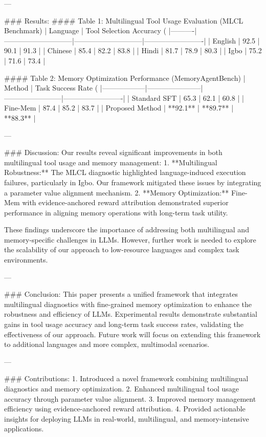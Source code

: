 ---

### Results:
#### Table 1: Multilingual Tool Usage Evaluation (MLCL Benchmark)
| Language | Tool Selection Accuracy (%
|----------|-----------------------------|-----------------------------|-------------------------|
| English  | 92.5                        | 90.1                        | 91.3                   |
| Chinese  | 85.4                        | 82.2                        | 83.8                   |
| Hindi    | 81.7                        | 78.9                        | 80.3                   |
| Igbo     | 75.2                        | 71.6                        | 73.4                   |

#### Table 2: Memory Optimization Performance (MemoryAgentBench)
| Method          | Task Success Rate (%
|------------------|-----------------------|------------------------|-------------------------|
| Standard SFT     | 65.3                 | 62.1                  | 60.8                   |
| Fine-Mem         | 87.4                 | 85.2                  | 83.7                   |
| Proposed Method  | **92.1**             | **89.7**              | **88.3**               |

---

### Discussion:
Our results reveal significant improvements in both multilingual tool usage and memory management:
1. **Multilingual Robustness:** The MLCL diagnostic highlighted language-induced execution failures, particularly in Igbo. Our framework mitigated these issues by integrating a parameter value alignment mechanism.
2. **Memory Optimization:** Fine-Mem with evidence-anchored reward attribution demonstrated superior performance in aligning memory operations with long-term task utility.

These findings underscore the importance of addressing both multilingual and memory-specific challenges in LLMs. However, further work is needed to explore the scalability of our approach to low-resource languages and complex task environments.

---

### Conclusion:
This paper presents a unified framework that integrates multilingual diagnostics with fine-grained memory optimization to enhance the robustness and efficiency of LLMs. Experimental results demonstrate substantial gains in tool usage accuracy and long-term task success rates, validating the effectiveness of our approach. Future work will focus on extending this framework to additional languages and more complex, multimodal scenarios.

---

### Contributions:
1. Introduced a novel framework combining multilingual diagnostics and memory optimization.
2. Enhanced multilingual tool usage accuracy through parameter value alignment.
3. Improved memory management efficiency using evidence-anchored reward attribution.
4. Provided actionable insights for deploying LLMs in real-world, multilingual, and memory-intensive applications. 

